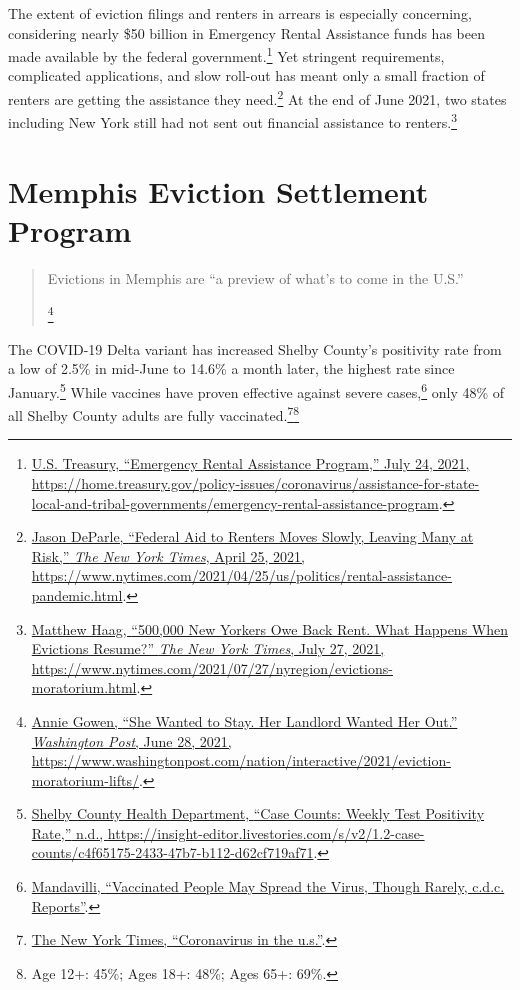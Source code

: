 \documentclass[
  openany]{book}
\begin{document}
The extent of eviction filings and renters in arrears is especially concerning, considering nearly \$50 billion in Emergency Rental Assistance funds has been made available by the federal government.\footnote{\protect\hyperlink{ref-u.s.treasury2021}{U.S. Treasury, {``Emergency Rental Assistance Program,''} July 24, 2021, \url{https://home.treasury.gov/policy-issues/coronavirus/assistance-for-state-local-and-tribal-governments/emergency-rental-assistance-program}}.} Yet stringent requirements, complicated applications, and slow roll-out has meant only a small fraction of renters are getting the assistance they need.\footnote{\protect\hyperlink{ref-deparle2021}{Jason DeParle, {``Federal Aid to Renters Moves Slowly, Leaving Many at Risk,''} \emph{The New York Times}, April 25, 2021, \url{https://www.nytimes.com/2021/04/25/us/politics/rental-assistance-pandemic.html}}.} At the end of June 2021, two states including New York still had not sent out financial assistance to renters.\footnote{\protect\hyperlink{ref-haag2021}{Matthew Haag, {``500,000 New Yorkers Owe Back Rent. What Happens When Evictions Resume?''} \emph{The New York Times}, July 27, 2021, \url{https://www.nytimes.com/2021/07/27/nyregion/evictions-moratorium.html}}.}

\hypertarget{memphis-eviction-settlement-program}{%
\section{Memphis Eviction Settlement Program}\label{memphis-eviction-settlement-program}}

\begin{quote}
Evictions in Memphis are ``a preview of what's to come in the U.S.''

\footnote{\protect\hyperlink{ref-gowen2021}{Annie Gowen, {``She Wanted to Stay. Her Landlord Wanted Her Out.''} \emph{Washington Post}, June 28, 2021, \url{https://www.washingtonpost.com/nation/interactive/2021/eviction-moratorium-lifts/}}.}
\end{quote}

The COVID-19 Delta variant has increased Shelby County's positivity rate from a low of 2.5\% in mid-June to 14.6\% a month later, the highest rate since January.\footnote{\protect\hyperlink{ref-shelbycountyhealthdepartment}{Shelby County Health Department, {``Case Counts: Weekly Test Positivity Rate,''} n.d., \url{https://insight-editor.livestories.com/s/v2/1.2-case-counts/c4f65175-2433-47b7-b112-d62cf719af71}}.} While vaccines have proven effective against severe cases,\footnote{\protect\hyperlink{ref-mandavilli2021}{Mandavilli, {``Vaccinated People May Spread the Virus, Though Rarely, c.d.c. Reports''}}.} only 48\% of all Shelby County adults are fully vaccinated.\footnote{\protect\hyperlink{ref-thenewyorktimes2020}{The New York Times, {``Coronavirus in the u.s.''}}.}\footnote{Age 12+: 45\%; Ages 18+: 48\%; Ages 65+: 69\%.}
\end{document}
